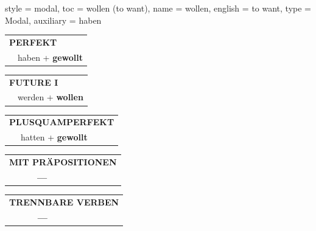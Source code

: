 \begin{verbentry}{
  style = {modal},
  toc = {wollen (to want)},
  name = {wollen},
  english = {to want},
  type = {Modal},
  auxiliary = {haben}
}
    \vspace{10pt}
 
    \begin{tabular}{rl}
     \multicolumn{2}{l}{\textbf{PERFEKT}}\\
  &  haben + \textbf{gewollt}\\
  \end{tabular}
\hfill
   \begin{tabular}{rl}
   
    \multicolumn{2}{l}{\textbf{FUTURE I} }\\
  &  werden + \textbf{wollen}\\
 
  \end{tabular}
\hfill
   \begin{tabular}{rl}
      \multicolumn{2}{l}{\textbf{PLUSQUAMPERFEKT}}\\
  &  hatten + \textbf{gewollt}\\
  \end{tabular}
  
  
\vspace{10pt}

\begin{tabular}{lll}
\multicolumn{3}{l}{\textbf{MIT PRÄPOSITIONEN}}\\
& \textbf{---} & \\
\end{tabular}
\hfill
\begin{tabular}{lll}
\multicolumn{3}{l}{\textbf{TRENNBARE VERBEN}}\\
& \textbf{---} & \\
\end{tabular}
\vspace{-5pt}
\end{verbentry}
